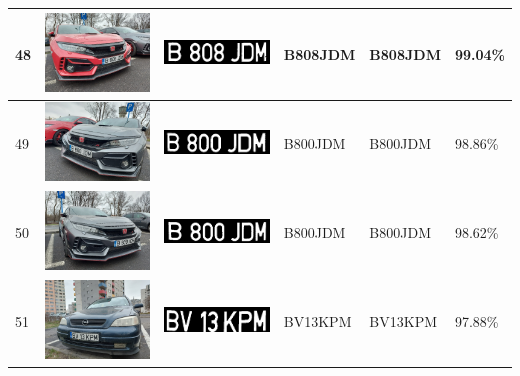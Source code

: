 \documentclass[a4paper,12pt]{report}
\begin{document}
\begin{longtable}{| m{0.6cm} | m{3cm} | m{3cm} | m{1.8cm} | m{1.8cm} | m{1.8cm} |}
    48  & \includegraphics[width=3cm,keepaspectratio]{dataset/27_s1.jpg}  & \includegraphics[width=3cm,keepaspectratio]{segmentari/48.jpg}  & B808JDM             & B808JDM              & 99.04\%    \\ \hline
    49  & \includegraphics[width=3cm,keepaspectratio]{dataset/28_d1.jpg}  & \includegraphics[width=3cm,keepaspectratio]{segmentari/49.jpg}  & B800JDM             & B800JDM              & 98.86\%    \\ \hline
    50  & \includegraphics[width=3cm,keepaspectratio]{dataset/28_s1.jpg}  & \includegraphics[width=3cm,keepaspectratio]{segmentari/50.jpg}  & B800JDM             & B800JDM              & 98.62\%    \\ \hline
    51  & \includegraphics[width=3cm,keepaspectratio]{dataset/29_d1.jpg}  & \includegraphics[width=3cm,keepaspectratio]{segmentari/51.jpg}  & BV13KPM             & BV13KPM              & 97.88\%    \\ \hline

\end{longtable}
\end{document}
